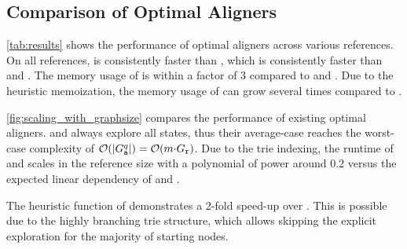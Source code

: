 \subsection{Comparison of Optimal Aligners}

\cref{tab:results} shows the performance of optimal aligners across various
references. On all references, \astarix is consistently faster than \dijkstra,
which is consistently faster than \pasgal and \bitparallel. The memory usage of
\dijkstra is within a factor of 3 compared to \pasgal and \bitparallel. Due to
the heuristic memoization, the memory usage of \astarix can grow several times
compared to \dijkstra.



\cref{fig:scaling_with_graphsize} compares the performance of existing optimal
aligners. \bitparallel and \pasgal always explore all states, thus their
average-case reaches the worst-case complexity of $\mathcal{O}(\lvert G_\texttt{a}^{q} \rvert) =
\mathcal{O}(m {\cdot} G_\texttt{r})$. Due to the trie indexing, the runtime of \astarix and
\dijkstra scales in the reference size with a polynomial of power around $0.2$
versus the expected linear dependency of \bitparallel and \pasgal.

The heuristic function of \astarix demonstrates a 2-fold speed-up over
\dijkstra. This is possible due to the highly branching trie structure, which
allows skipping the explicit exploration for the majority of starting nodes. 

